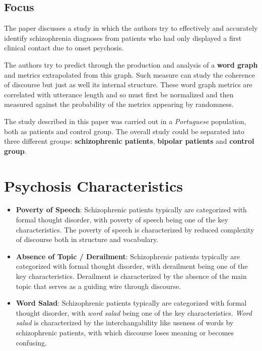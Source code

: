 \documentclass{Paper_Summary}
\begin{document}
\makepapertitle

\breakline

\begin{center}
    \section*{Focus}
\end{center}

    The paper discusses a study in which the authors try to effectively and accurately identify schizophrenia diagnoses from patients who had only displayed a first clinical contact due to onset psychosis.

    The authors try to predict through the production and analysis of a \textbf{word graph} and metrics extrapolated from this graph. Such measure can study the coherence of discourse but just as well its internal structure. These word graph metrics are correlated with utterance length and so must first be normalized and then measured against the probability of the metrics appearing by randomness.

    The study described in this paper was carried out in a \emph{Portuguese} population, both as patients and control group. The overall study could be separated into three different groups: \textbf{schizophrenic patients}, \textbf{bipolar patients} and \textbf{control group}.

\breakline

\newpage

\section{Psychosis Characteristics}
    \begin{itemize}
        \item \textbf{Poverty of Speech}: Schizophrenic patients typically are categorized with formal thought disorder, with poverty of speech being one of the key characteristics. The poverty of speech is characterized by reduced complexity of discourse both in structure and vocabulary.
        \item \textbf{Absence of Topic / Derailment}: Schizophrenic patients typically are categorized with formal thought disorder, with derailment being one of the key characteristics. Derailment is characterized by the absence of the main topic that serves as a guiding wire through discourse.
        \item \textbf{Word Salad}: Schizophrenic patients typically are categorized with formal thought disorder, with \emph{word salad} being one of the key characteristics. \emph{Word salad} is characterized by the interchangability like useness of words by schizophrenic patients, with which discourse loses meaning or becomes confusing. 
    \end{itemize}
\end{document}
